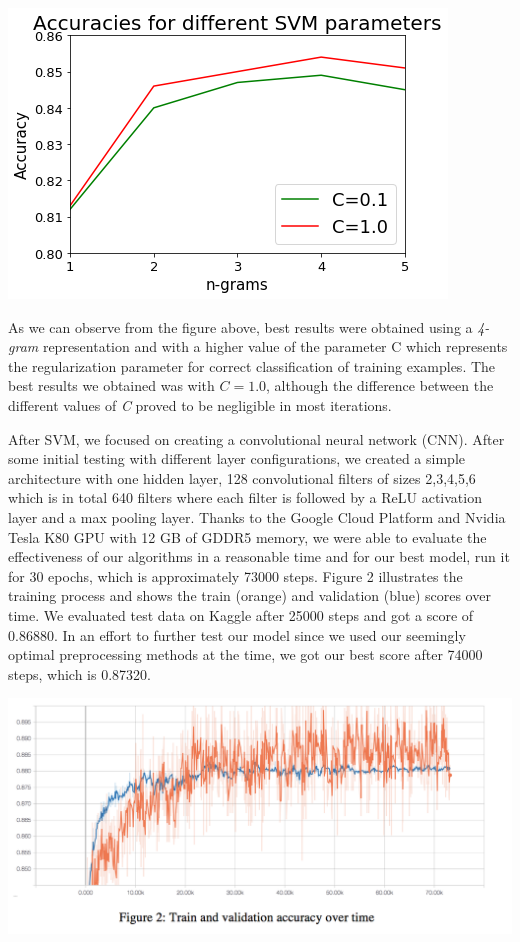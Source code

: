 \documentclass[10pt,conference]{IEEEtran}
\begin{document}
\bigskip
\includegraphics[scale=0.53]{SVM_accuracies}

As we can observe from the figure above, best results were obtained using a \textit{4-gram} representation and with a higher value of the parameter C which represents the regularization parameter for correct classification of training examples. The best results we obtained was with $C=1.0$, although the difference between the different values of \textit{C} proved to be negligible in most iterations.

After SVM, we focused on creating a convolutional neural network (CNN). After some initial testing with different layer configurations, we created a simple architecture with one hidden layer, 128 convolutional filters of sizes {2,3,4,5,6} which is in total 640 filters where each filter is followed by a ReLU activation layer and a max pooling layer. Thanks to the Google Cloud Platform and Nvidia Tesla K80 GPU with 12 GB of GDDR5 memory, we were able to evaluate the effectiveness of our algorithms in a reasonable time and for our best model, run it for 30 epochs, which is approximately 73000 steps. Figure 2 illustrates the training process and shows the train (orange) and validation (blue) scores over time. We evaluated test data on Kaggle after 25000 steps and got a score of 0.86880. In an effort to further test our model since we used our seemingly optimal preprocessing methods at the time, we got our best score after 74000 steps, which is 0.87320. 

\bigskip
\includegraphics[scale=0.42]{CNN_training}
\end{document}
